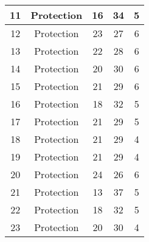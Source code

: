\documentclass[results.tex]{subfiles}
\begin{document}
\begin{center}
\begin{tabular}{| c || c | c | c | c |}
            \hline
            11                      & Protection                   & 16                     & 34                      & 5                    \\
            \hline
            12                      & Protection                   & 23                     & 27                      & 6                    \\
            \hline
            13                      & Protection                   & 22                     & 28                      & 6                    \\
            \hline
            14                      & Protection                   & 20                     & 30                      & 6                    \\
            \hline
            15                      & Protection                   & 21                     & 29                      & 6                    \\
            \hline
            16                      & Protection                   & 18                     & 32                      & 5                    \\
            \hline
            17                      & Protection                   & 21                     & 29                      & 5                    \\
            \hline
            18                      & Protection                   & 21                     & 29                      & 4                    \\
            \hline
            19                      & Protection                   & 21                     & 29                      & 4                    \\
            \hline
            20                      & Protection                   & 24                     & 26                      & 6                    \\
            \hline
            21                      & Protection                   & 13                     & 37                      & 5                    \\
            \hline
            22                      & Protection                   & 18                     & 32                      & 5                    \\
            \hline
            23                      & Protection                   & 20                     & 30                      & 4                    \\

\end{tabular}
\end{center}
\end{document}
